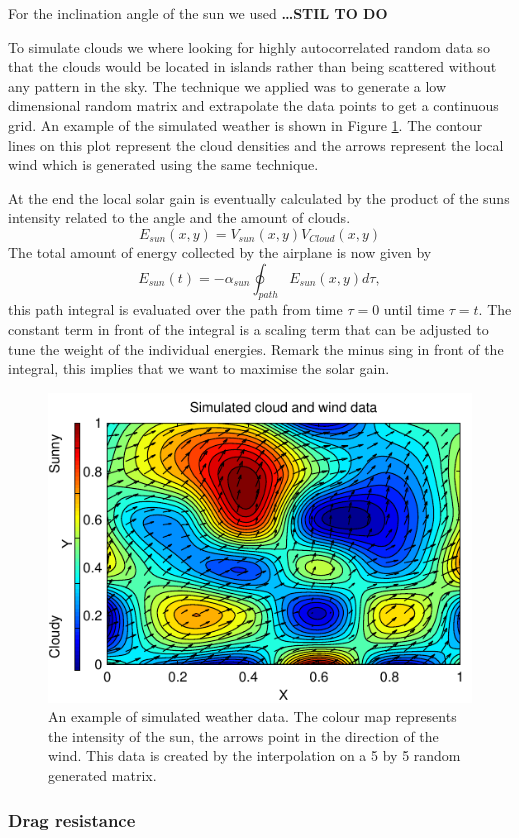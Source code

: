 For the inclination angle of the sun we used \textbf{\dots STIL TO DO}

To simulate clouds we where looking for highly autocorrelated random data so that the clouds would be located in islands rather than being scattered without any pattern in the sky.
The technique we applied was to generate a low dimensional random matrix and extrapolate the data points to get a continuous grid.
An example of the simulated weather is shown in Figure \ref{fig:RandomWeather}.
The contour lines on this plot represent the cloud densities and the arrows represent the local wind which is generated using the same technique.

At the end the local solar gain is eventually calculated by the product of the suns intensity related to the angle and the amount of clouds.
\begin{equation}
E_{sun}(x,y)  =  V_{sun}(x,y) V_{Cloud}(x,y)
\end{equation}
The total amount of energy collected by the airplane is now given by 
\begin{equation}
E_{sun}(t)  =  -\alpha_{sun}\oint_{path} E_{sun}(x,y)  d\tau,
\end{equation}
this path integral is evaluated over the path from time $ \tau=0 $ until time $ \tau=t $.
The constant term in front of the integral is a scaling term that can be adjusted to tune the weight of the individual energies.
Remark the minus sing in front of the integral, this implies that we want to maximise the solar gain.

\begin{figure}
\centering
\includegraphics[width=0.5\linewidth]{../src/plot/RandomWeather}
\caption{An example of  simulated weather data. The colour map represents the intensity of the sun, the arrows point in the direction of the wind. This data is created by the  interpolation on a 5 by 5 random generated matrix. }
\label{fig:RandomWeather}
\end{figure}


\subsubsection{Drag resistance}

